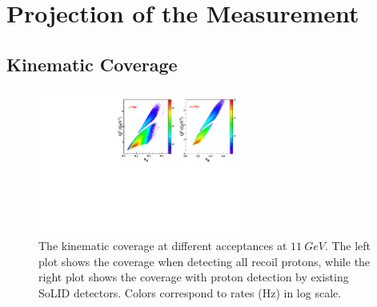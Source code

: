 \section{Projection of the Measurement}
\subsection{Kinematic Coverage}
\begin{figure}[!ht]
 \begin{center}
      \includegraphics[type=pdf, ext=.pdf,read=.pdf,width=0.6\textwidth]{./figures/E11_Q2_x_epip_Q2gt1}
 \caption[The kinematic coverage at different acceptances]{\footnotesize{The kinematic coverage at different acceptances at $11~GeV$. The left plot shows the coverage when detecting all recoil protons, while the right plot shows the coverage with proton detection by existing SoLID detectors. Colors correspond to rates (Hz) in log scale.}}
  \label{kin_cor}
  \end{center}
\end{figure}

